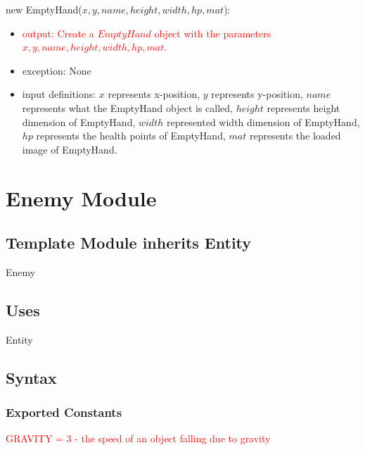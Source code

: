 \documentclass[12pt]{article}
\newcommand{\m}[1]{\mbox{#1}}
\begin{document}
new EmptyHand($x, y, name, height, width, hp, mat$):
\begin{itemize}
    \item \textcolor{red}{output: Create a $EmptyHand$ object with the parameters $x, y, name, height, width, hp, mat$.}
    \item exception: None
    \item input definitions: $x$ represents x-position, $y$ represents y-position, $name$ represents what the EmptyHand object is called, $height$ represents height dimension of EmptyHand, $width$ represented width dimension of EmptyHand, $hp$ represents the health points of EmptyHand, $mat$ represents the loaded image of EmptyHand.
\end{itemize}

\newpage

\section*{Enemy Module}

\subsection*{Template Module inherits Entity}

Enemy

\subsection*{Uses}

Entity

\subsection*{Syntax}

\subsubsection*{Exported Constants}

\textcolor{red}{GRAVITY = 3 - the speed of an object falling due to gravity}\\
\end{document}
